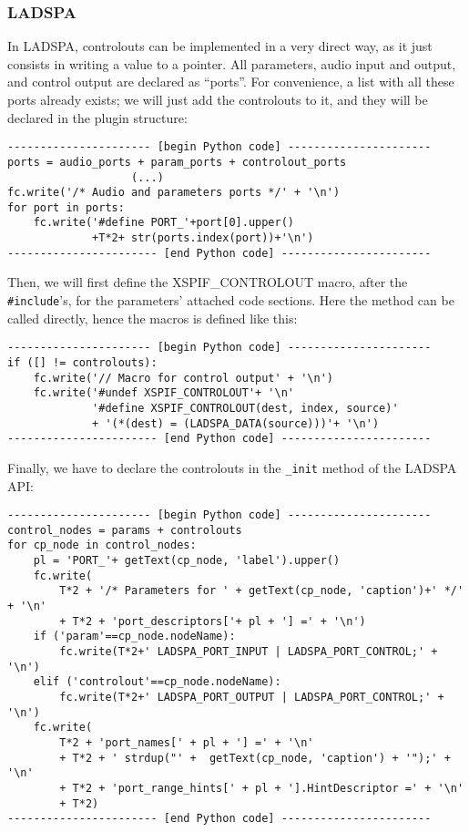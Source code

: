 \subsubsection{LADSPA}
\noindent In LADSPA, controlouts can be implemented in a very direct way,
 as it just consists in writing a value to a pointer.
\noindent All parameters, audio input and output, and control output 
are declared as ``ports''. For convenience, a list with all these 
ports already exists; we will just add the controlouts to it, 
and they will be declared in the plugin structure:

\begin{verbatim}
---------------------- [begin Python code] ----------------------
ports = audio_ports + param_ports + controlout_ports
                   (...)
fc.write('/* Audio and parameters ports */' + '\n')
for port in ports:
    fc.write('#define PORT_'+port[0].upper()
             +T*2+ str(ports.index(port))+'\n')
----------------------- [end Python code] -----------------------
\end{verbatim}

\noindent Then, we will first define the XSPIF\_CONTROLOUT macro, after the \verb|#include|'s, for the parameters' attached code sections. Here the method can be called directly, hence the macros is defined like this:

\begin{verbatim}
---------------------- [begin Python code] ----------------------
if ([] != controlouts):
    fc.write('// Macro for control output' + '\n')
    fc.write('#undef XSPIF_CONTROLOUT'+ '\n'
             '#define XSPIF_CONTROLOUT(dest, index, source)'
             + '(*(dest) = (LADSPA_DATA(source)))'+ '\n')
----------------------- [end Python code] -----------------------
\end{verbatim}


\noindent Finally, we have to declare the controlouts in the \verb|_init| method of the LADSPA API:

\begin{verbatim}
---------------------- [begin Python code] ----------------------
control_nodes = params + controlouts
for cp_node in control_nodes:
    pl = 'PORT_'+ getText(cp_node, 'label').upper()
    fc.write(
        T*2 + '/* Parameters for ' + getText(cp_node, 'caption')+' */' + '\n'
        + T*2 + 'port_descriptors['+ pl + '] =' + '\n')
    if ('param'==cp_node.nodeName):
        fc.write(T*2+' LADSPA_PORT_INPUT | LADSPA_PORT_CONTROL;' + '\n')
    elif ('controlout'==cp_node.nodeName):
        fc.write(T*2+' LADSPA_PORT_OUTPUT | LADSPA_PORT_CONTROL;' + '\n')
    fc.write(
        T*2 + 'port_names[' + pl + '] =' + '\n'
        + T*2 + ' strdup("' +  getText(cp_node, 'caption') + '");' + '\n'
        + T*2 + 'port_range_hints[' + pl + '].HintDescriptor =' + '\n'
        + T*2)
----------------------- [end Python code] -----------------------
\end{verbatim}

